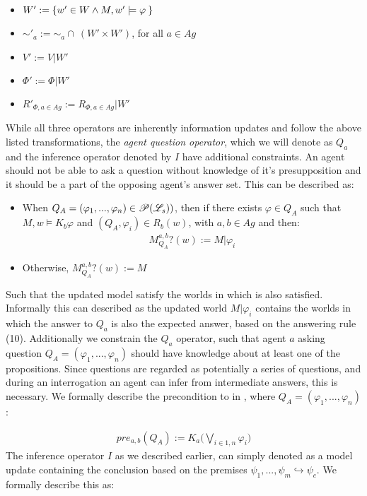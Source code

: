 \begin{itemize}
	\item $W' := \left\{ w' \in W \land M, w' \models \varphi\: \right\}$
	\item $\sim'_a := \sim_a \cap \:(W' \times W')$, for all $a \in Ag$
	\item $V' := V | W'$
	\item $\Phi' := \Phi | W'$
	\item $R'_{\Phi, a\in Ag} := R_{\Phi, a\in Ag} | W'$ 
\end{itemize}
While all three operators are inherently information updates and follow the above listed transformations, the \textit{agent question operator}, which we will denote as $Q_a$ and the inference operator denoted by $I$ have additional constraints. An agent should not be able to ask a question without knowledge of it's presupposition and it should be a part of the opposing agent's answer set. This can be described as:
\begin{itemize}
	\item When $Q_A = (\varphi_1,...,\varphi_n) \in \mathscr{P}(\mathscr{L}_s))$, then if there exists $\varphi \in Q_A$ such that $M, w \models K_b\varphi$ and $(Q_A, \varphi_i) \in R_b (w)$, with $a, b \in Ag$ and then:
	\begin{align}
		M^{a,b}_{Q_A}?(w) := M |\varphi_i
	\end{align}
	\item Otherwise, $M^{a,b}_{Q_{A}}?(w) := M$
\end{itemize}
Such that the updated model satisfy the worlds in which \proposition\: is also satisfied. Informally this can described as the updated world $M|\varphi_i$ contains the worlds in which the answer to $Q_a$ is also the expected answer, based on the answering rule (10). Additionally we constrain the $Q_a$ operator, such that agent $a$ asking question $Q_A = (\varphi_1,..., \varphi_n)$ should have knowledge about at least one of the propositions. Since questions are regarded as potentially a series of questions, and during an interrogation an agent can infer from intermediate answers, this is necessary. We formally describe the precondition to in \dynlang, where $Q_A = (\varphi_1,...,\varphi_n)$:

\begin{gather}
	pre_{a,b}(Q_A) := K_a\Biggl(\bigvee\limits_{i\in 1,n}\varphi_i\Biggr)
\end{gather}
The inference operator $I$ as we described earlier, can simply denoted as a model update containing the conclusion based on the premises ${\psi_1,...,\psi_m} \hookrightarrow \psi_c$. We formally describe this as:

